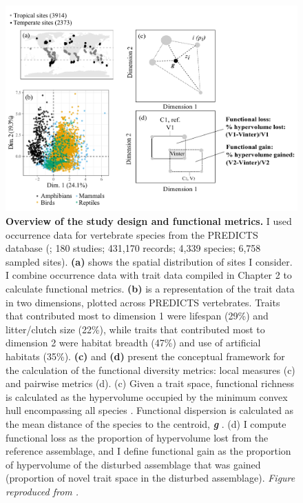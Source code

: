 \begin{figure}[h!]
\centering
\includegraphics[scale=0.65]{figures/Chapter_FD/Figure1}
\caption[Overview of the study design and functional metrics.]{\textbf{Overview of the study design and functional metrics.} I used occurrence data for vertebrate species from the PREDICTS database (\citep{Hudson2014, Hudson2017}; 180 studies; 431,170 records; 4,339 species; 6,758 sampled sites). \textbf{(a)} shows the spatial distribution of sites I consider. I combine occurrence data with trait data compiled in Chapter 2 to calculate functional metrics. \textbf{(b)} is a representation of the trait data in two dimensions, plotted across PREDICTS vertebrates. Traits that contributed most to dimension 1 were lifespan (29\%) and litter/clutch size (22\%), while traits that contributed most to dimension 2 were habitat breadth (47\%) and use of artificial habitats (35\%). \textbf{(c)} and \textbf{(d)} present the conceptual framework for the calculation of the functional diversity metrics: local measures (c) and pairwise metrics (d). (c) Given a trait space, functional richness is calculated as the hypervolume occupied by the minimum convex hull encompassing all species \cite{Villeger2008}. Functional dispersion is calculated as the mean distance of the species to the centroid, \textbf{\textit{g}} \cite{Laliberte2010}. (d) I compute functional loss as the proportion of hypervolume lost from the reference assemblage, and I define functional gain as the proportion of hypervolume of the disturbed assemblage that was gained (proportion of novel trait space in the disturbed assemblage). \textit{Figure reproduced from \citet{Etard2021}.}}
\label{chap3_fig1}
\end{figure}



